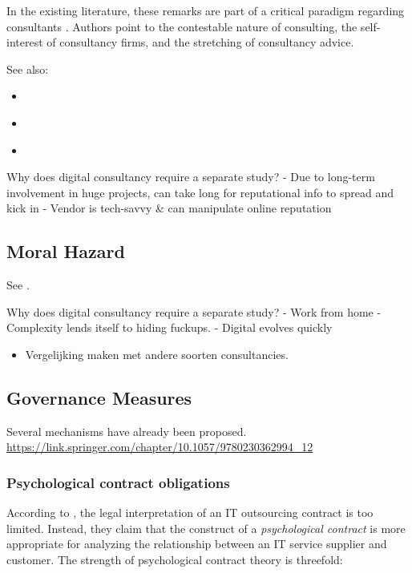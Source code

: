\documentclass[12pt]{article}
\providecommand{\tightlist}{%
  \setlength{\itemsep}{0pt}\setlength{\parskip}{0pt}}
\begin{document}
In the existing literature, these remarks are part of a critical
paradigm regarding consultants \citep[ 4-5]{armbruster2006}. Authors
point to the contestable nature of consulting, the self-interest of
consultancy firms, and the stretching of consultancy advice.

See also:

\begin{itemize}
\tightlist
\item
  \citep{wright2002}
\item
  \citep{david2013}
\item
  \citep{mahoney2016}
\end{itemize}

Why does digital consultancy require a separate study? - Due to
long-term involvement in huge projects, can take long for reputational
info to spread and kick in - Vendor is tech-savvy \& can manipulate
online reputation

\hypertarget{moral-hazard}{%
\subsection{Moral Hazard}\label{moral-hazard}}

See \citep[ 72-73]{armbruster2006}.

Why does digital consultancy require a separate study? - Work from home
- Complexity lends itself to hiding fuckups. - Digital evolves quickly

\begin{itemize}
\tightlist
\item
  Vergelijking maken met andere soorten consultancies.
\end{itemize}

\hypertarget{governance-measures}{%
\subsection{Governance Measures}\label{governance-measures}}

Several mechanisms have already been proposed.
\url{https://link.springer.com/chapter/10.1057/9780230362994_12}

\hypertarget{psychological-contract-obligations}{%
\subsubsection{Psychological contract
obligations}\label{psychological-contract-obligations}}

According to \citet[357]{ang2004}, the legal interpretation of an IT
outsourcing contract is too limited. Instead, they claim that the
construct of a \emph{psychological contract} is more appropriate for
analyzing the relationship between an IT service supplier and customer.
The strength of psychological contract theory is threefold:
\end{document}

